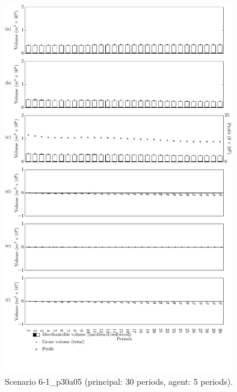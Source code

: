 \begin{figure}[h]
  \centering
  \includegraphics[width=10cm]{images/appendix/s6-1_p30a05}
  \caption{Scenario 6-1\_p30a05 (principal: 30 periods, agent: 5 periods).}
  \label{fig:s6-1_p30a05}
\end{figure}

